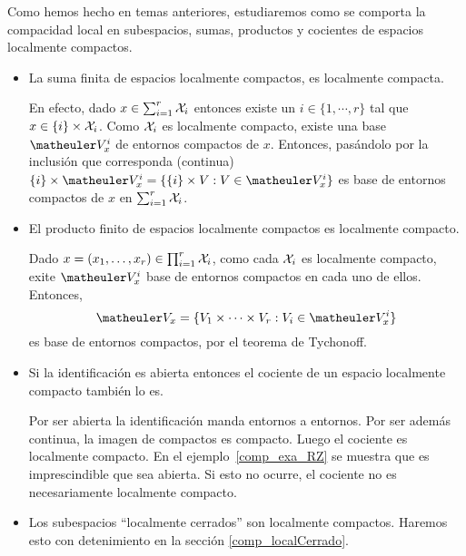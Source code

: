 Como hemos hecho en temas anteriores, estudiaremos como se comporta la compacidad local en subespacios, sumas, productos y cocientes de espacios localmente compactos.

\begin{itemize}
	\item La suma finita de espacios localmente compactos, es localmente compacta.
	
	En efecto, dado $x\in\sum_{i=1}^r \mathcal{X}_i$ entonces existe un $i\in\{1,\cdots,r\}$ tal que $x\in \{i\}\times \mathcal{X}_i$. Como $\mathcal{X}_i$ es localmente compacto, existe una base $\Va{x}^i$ de entornos compactos de $x$. Entonces, pasándolo por la inclusión que corresponda (continua) $\{i\}\times \Va{x}^i=\{\{i\}\times V : V\in\Va{x}^i\}$ es base de entornos compactos de $x$ en $\sum_{i=1}^r \mathcal{X}_i$.
	
	\item El producto finito de espacios localmente compactos es localmente compacto.
	
	Dado $x=(x_1,\dots,x_r)\in\prod_{i=1}^r\mathcal{X}_i$, como cada $\mathcal{X}_i$ es localmente compacto, exite $\Va{x}^i$ base de entornos compactos en cada uno de ellos. Entonces, 
	\[\Va{x}=\{V_1\times\cdots\times V_r: V_i\in\Va{x}^i\}\]
	es base de entornos compactos, por el teorema de Tychonoff.
	
	\item Si la identificación es abierta entonces el cociente de un espacio localmente compacto también lo es.
	
	Por ser abierta la identificación manda entornos a entornos. Por ser además continua, la imagen de compactos es compacto. Luego el cociente es localmente compacto. En el ejemplo~\ref{comp_exa_RZ} se muestra que es imprescindible que sea abierta. Si esto no ocurre, el cociente no es necesariamente localmente compacto.
	
	\item Los subespacios ``localmente cerrados'' son localmente compactos. Haremos esto con detenimiento en la sección \ref{comp_localCerrado}.
\end{itemize}

